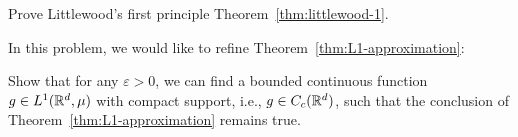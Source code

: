 \begin{problem}\label{prb:littlewood_1}
	Prove Littlewood's first principle Theorem~\ref{thm:littlewood-1}.
\end{problem}

\begin{problem}
	In this problem, we would like to refine Theorem~\ref{thm:L1-approximation}:
	
	Show that for any $\varepsilon>0$, we can find a bounded continuous function $g\in L^1(\mathbb R^d,\mu)$ with compact support, i.e., $g\in C_c(\mathbb R^d)$, such that the conclusion of Theorem~\ref{thm:L1-approximation} remains true.
\end{problem}
